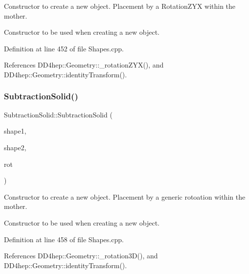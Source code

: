 Constructor to create a new object. Placement by a Rotation\+Z\+YX within the mother. 

Constructor to be used when creating a new object. 

Definition at line 452 of file Shapes.\+cpp.



References D\+D4hep\+::\+Geometry\+::\+\_\+rotation\+Z\+Y\+X(), and D\+D4hep\+::\+Geometry\+::identity\+Transform().

\hypertarget{class_d_d4hep_1_1_geometry_1_1_subtraction_solid_a9ffb916760e748c1096ab8d765d7884a}{}\label{class_d_d4hep_1_1_geometry_1_1_subtraction_solid_a9ffb916760e748c1096ab8d765d7884a} 
\subsubsection{\texorpdfstring{Subtraction\+Solid()}{SubtractionSolid()}\hspace{0.1cm}{\footnotesize\ttfamily [7/8]}}
{\footnotesize\ttfamily Subtraction\+Solid\+::\+Subtraction\+Solid (\begin{DoxyParamCaption}\item[{const \hyperlink{namespace_d_d4hep_1_1_geometry_a83de90a8dcc7378ba47d54ef9a6a687b}{Solid} \&}]{shape1,  }\item[{const \hyperlink{namespace_d_d4hep_1_1_geometry_a83de90a8dcc7378ba47d54ef9a6a687b}{Solid} \&}]{shape2,  }\item[{const \hyperlink{namespace_d_d4hep_1_1_geometry_a022fecb763315fa2bf39cbb648944a0e}{Rotation3D} \&}]{rot }\end{DoxyParamCaption})}



Constructor to create a new object. Placement by a generic rotoation within the mother. 

Constructor to be used when creating a new object. 

Definition at line 458 of file Shapes.\+cpp.



References D\+D4hep\+::\+Geometry\+::\+\_\+rotation3\+D(), and D\+D4hep\+::\+Geometry\+::identity\+Transform().

\hypertarget{class_d_d4hep_1_1_geometry_1_1_subtraction_solid_a3e6d305e752d6f429ddbe2f2a8a2f18d}{}\label{class_d_d4hep_1_1_geometry_1_1_subtraction_solid_a3e6d305e752d6f429ddbe2f2a8a2f18d} 
